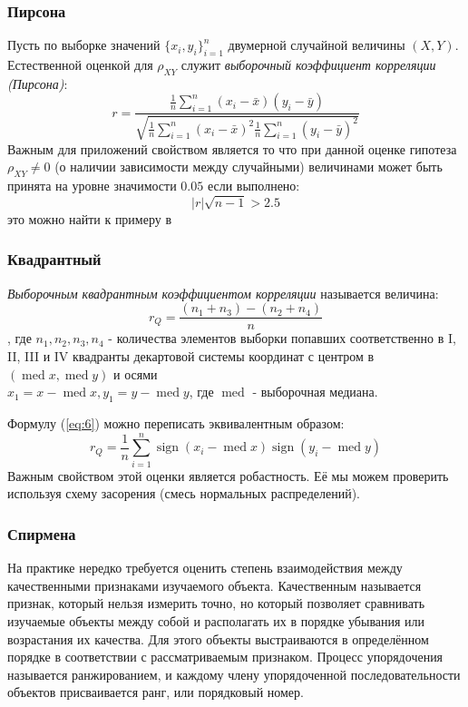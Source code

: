 \documentclass[12pt,a4paper]{article}
\DeclareMathOperator{\med}{med}
\DeclareMathOperator{\sign}{sign}
\begin{document}
\subsubsection{Пирсона}
Пусть по выборке значений $\{x_i, y_i\}_{i=1}^n$ двумерной случайной величины $(X,Y)$. Естественной оценкой для $\rho_{XY}$ служит \textit{выборочный коэффициент корреляции (Пирсона)}:
\begin{equation}\label{eq:4}
	r = \frac{\frac{1}{n} \sum_{i=1}^{n}{(x_i - \bar{x})(y_i - \bar{y})}}
	{\sqrt{
			\frac{1}{n} \sum_{i=1}^{n}{(x_i-\bar{x})^2}
			\frac{1}{n} \sum_{i=1}^{n}{(y_i-\bar{y})^2}}}
\end{equation}
Важным для приложений свойством является то что при данной оценке гипотеза $\rho_{XY} \neq 0$ (о наличии зависимости между случайными) величинами может быть принята на уровне значимости $0.05$ если выполнено: 
\begin{equation}\label{eq:5}
	|r|\sqrt{n-1} > 2.5
\end{equation}
это можно найти к примеру в \cite[стр. 538]{verrazdely}

\subsubsection{Квадрантный}
\textit{Выборочным квадрантным коэффициентом корреляции} называется величина:
\begin{equation}\label{eq:6}
	r_Q = \frac{(n_1 + n_3) - (n_2 + n_4)}{n}
\end{equation}
, где $n_1, n_2, n_3, n_4$ - количества элементов выборки попавших соответственно в I, II, III и IV квадранты декартовой системы координат с центром в $(\med{x}, \med{y})$ и осями \\
$x_1 = x - \med{x}, y_1 = y - \med{y}$, где $\med$ - выборочная медиана.

Формулу (\ref{eq:6}) можно переписать эквивалентным образом:
\begin{equation}\label{eq:7}
	r_Q = \frac{1}{n}\sum_{i=1}^{n}{\sign(x_i -\med{x})\sign(y_i -\med{y})}
\end{equation}
Важным свойством этой оценки является робастность. Её мы можем проверить используя схему засорения (смесь нормальных распределений).

\subsubsection{Спирмена}
На практике нередко требуется оценить степень взаимодействия между качественными признаками изучаемого объекта. Качественным называется признак, который нельзя измерить точно, но который позволяет сравнивать изучаемые объекты между собой и располагать их в порядке убывания или
возрастания их качества. Для этого объекты выстраиваются в определённом порядке в соответствии с рассматриваемым признаком. Процесс упорядочения называется ранжированием, и каждому члену упорядоченной последовательности объектов присваивается ранг, или порядковый номер. \\
\end{document}
